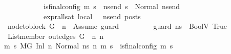 \begin{isabellebody}
\ \ \ \ \ \ \ \ \ \ \ \ \ \ \ \ \ {\isacharparenleft}{\kern0pt}is{\isacharunderscore}{\kern0pt}final{\isacharunderscore}{\kern0pt}config\ {\isacharparenleft}{\kern0pt}m{\isacharcomma}{\kern0pt}\ s{\isacharparenright}{\kern0pt}\ {\isasymlongrightarrow}\ {\isacharparenleft}{\kern0pt}{\isasymforall}ns{\isacharunderscore}{\kern0pt}end{\isachardot}{\kern0pt}\ s\ {\isacharequal}{\kern0pt}\ Normal\ ns{\isacharunderscore}{\kern0pt}end\ {\isasymlongrightarrow}\ \isanewline
\ \ \ \ \ \ \ \ \ \ \ \ \ \ \ \ \ {\isacharparenleft}{\kern0pt}expr{\isacharunderscore}{\kern0pt}all{\isacharunderscore}{\kern0pt}sat\ {\isasymLambda}{}{\isacharunderscore}{\kern0pt}local\ {\isasymGamma}\ {\isasymOmega}\ ns{\isacharunderscore}{\kern0pt}end{\isacharparenright}{\kern0pt}\ posts{\isacharparenright}{\kern0pt}{\isacharparenright}{\kern0pt}{\isachardoublequoteclose}\isanewline
\ \ \ \ \ \ \ {\isachardoublequoteopen}node{\isacharunderscore}{\kern0pt}to{\isacharunderscore}{\kern0pt}block\ G\ {\isacharbang}{\kern0pt}\ n{}\ {\isacharequal}{\kern0pt}\ {\isacharbrackleft}{\kern0pt}Assume\ guard{\isacharbrackright}{\kern0pt}{\isachardoublequoteclose}\isanewline
\ \ \ \ \ \ \ {\isachardoublequoteopen}{\isasymLambda}{\isacharcomma}{\kern0pt}{\isasymGamma}{\isacharcomma}{\kern0pt}{\isasymOmega}\ {\isasymturnstile}\ {\isasymlangle}guard{\isacharcomma}{\kern0pt}\ ns{}{\isasymrangle}\ {\isasymDown}\ BoolV\ True{\isachardoublequoteclose}\isanewline
\ \ \ \ \ \ \ {\isachardoublequoteopen}List{\isachardot}{\kern0pt}member\ {\isacharparenleft}{\kern0pt}out{\isacharunderscore}{\kern0pt}edges\ G\ {\isacharbang}{\kern0pt}\ n{}{\isacharparenright}{\kern0pt}\ n{}{\isachardoublequoteclose}\isanewline
\ \ \ \ \ {\isachardoublequoteopen}{\isasymAnd}\ m\ s{\isachardot}{\kern0pt}\ {\isacharparenleft}{\kern0pt}M{\isacharcomma}{\kern0pt}{\isasymLambda}{\isacharcomma}{\kern0pt}{\isasymGamma}{\isacharcomma}{\kern0pt}{\isasymOmega}{\isacharcomma}{\kern0pt}G\ {\isasymturnstile}{\isacharparenleft}{\kern0pt}Inl\ n{}{\isacharcomma}{\kern0pt}\ Normal\ ns{}{\isacharparenright}{\kern0pt}\ {\isacharminus}{\kern0pt}n{\isasymrightarrow}{\isacharasterisk}{\kern0pt}\ {\isacharparenleft}{\kern0pt}m{\isacharcomma}{\kern0pt}\ s{\isacharparenright}{\kern0pt}{\isacharparenright}{\kern0pt}\ {\isasymLongrightarrow}\ {\isacharparenleft}{\kern0pt}is{\isacharunderscore}{\kern0pt}final{\isacharunderscore}{\kern0pt}config\ {\isacharparenleft}{\kern0pt}m{\isacharcomma}{\kern0pt}\ s{\isacharparenright}{\kern0pt}\ {\isasymLongrightarrow}\ \isanewline

\end{isabellebody}
